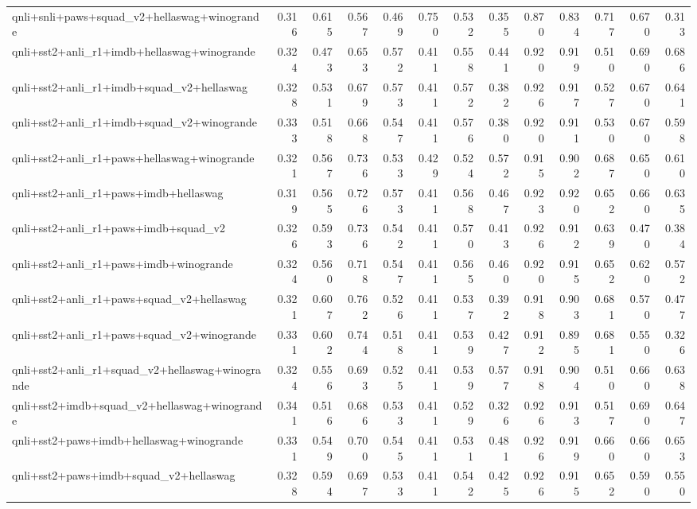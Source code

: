 \begin{table}[t]
\begin{tabular}{lrrrrrrrrrrrr}
    qnli+snli+paws+squad\_v2+hellaswag+winogrande & 0.316 & 0.615 & 0.567 & 0.469 & 0.750 & 0.532 & 0.355 & 0.870 & 0.834 & 0.717 & 0.670 & 0.313 \\
    qnli+sst2+anli\_r1+imdb+hellaswag+winogrande & 0.324 & 0.473 & 0.653 & 0.572 & 0.411 & 0.558 & 0.441 & 0.920 & 0.919 & 0.510 & 0.690 & 0.686 \\
    qnli+sst2+anli\_r1+imdb+squad\_v2+hellaswag & 0.328 & 0.531 & 0.679 & 0.573 & 0.411 & 0.572 & 0.382 & 0.926 & 0.917 & 0.527 & 0.670 & 0.641 \\
    qnli+sst2+anli\_r1+imdb+squad\_v2+winogrande & 0.333 & 0.518 & 0.668 & 0.547 & 0.411 & 0.576 & 0.380 & 0.920 & 0.911 & 0.530 & 0.670 & 0.598 \\
    qnli+sst2+anli\_r1+paws+hellaswag+winogrande & 0.321 & 0.567 & 0.736 & 0.533 & 0.429 & 0.524 & 0.572 & 0.915 & 0.902 & 0.687 & 0.650 & 0.610 \\
    qnli+sst2+anli\_r1+paws+imdb+hellaswag & 0.319 & 0.565 & 0.726 & 0.573 & 0.411 & 0.568 & 0.467 & 0.923 & 0.920 & 0.652 & 0.660 & 0.635 \\
    qnli+sst2+anli\_r1+paws+imdb+squad\_v2 & 0.326 & 0.593 & 0.736 & 0.542 & 0.411 & 0.570 & 0.413 & 0.926 & 0.912 & 0.639 & 0.470 & 0.384 \\
    qnli+sst2+anli\_r1+paws+imdb+winogrande & 0.324 & 0.560 & 0.718 & 0.547 & 0.411 & 0.565 & 0.460 & 0.920 & 0.915 & 0.652 & 0.620 & 0.572 \\
    qnli+sst2+anli\_r1+paws+squad\_v2+hellaswag & 0.321 & 0.607 & 0.762 & 0.526 & 0.411 & 0.537 & 0.392 & 0.918 & 0.903 & 0.681 & 0.570 & 0.477 \\
    qnli+sst2+anli\_r1+paws+squad\_v2+winogrande & 0.331 & 0.602 & 0.744 & 0.518 & 0.411 & 0.539 & 0.427 & 0.912 & 0.895 & 0.681 & 0.550 & 0.326 \\
    qnli+sst2+anli\_r1+squad\_v2+hellaswag+winogrande & 0.324 & 0.556 & 0.693 & 0.525 & 0.411 & 0.539 & 0.577 & 0.918 & 0.904 & 0.510 & 0.660 & 0.638 \\
    qnli+sst2+imdb+squad\_v2+hellaswag+winogrande & 0.341 & 0.516 & 0.686 & 0.533 & 0.411 & 0.529 & 0.326 & 0.926 & 0.913 & 0.517 & 0.690 & 0.647 \\
    qnli+sst2+paws+imdb+hellaswag+winogrande & 0.331 & 0.549 & 0.700 & 0.545 & 0.411 & 0.531 & 0.481 & 0.926 & 0.919 & 0.660 & 0.660 & 0.653 \\
    qnli+sst2+paws+imdb+squad\_v2+hellaswag & 0.328 & 0.594 & 0.697 & 0.533 & 0.411 & 0.542 & 0.425 & 0.926 & 0.915 & 0.652 & 0.590 & 0.550 \\

\end{tabular}
\end{table}
